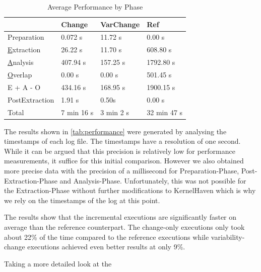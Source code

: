 \documentclass[a4paper]{article}
\begin{document}
\begin {table}[h]
\begin{center}
\caption {Average Performance by Phase} \label{tab:performance} 
\begin{tabular}{|l | l | l | l|}
\hline
                               & Change                 & VarChange          & Ref  \\ \hline
	Preparation                & 0.072 s                & 11.72 s            & 0.00 s \\
	\underline{E}xtraction     & 26.22 s                & 11.70 s            & 608.80 s \\
	\underline{A}nalysis       & 407.94 s               & 157.25 s           & 1792.80 s \\
	\underline{O}verlap        & 0.00 s                 & 0.00 s             & 501.45 s \\
	E + A - O                  & 434.16 s               & 168.95 s           & 1900.15 s \\
	PostExtraction             & 1.91 s                 & 0.50s              & 0.00 s \\ \hline
	Total                      & 7 min 16 s             & 3 min 2 s          & 32 min 47 s \\ \hline
\end{tabular}
\end{center}
\end{table}

The results shown in \autoref{tab:performance} were generated by analysing the timestamps of each log file. The timestamps have a resolution of one second. While it can be argued that this precision is relatively low for performance measurements, it suffice for this initial comparison. However we also obtained more precise data with the precision of a millisecond for Preparation-Phase, Post-Extraction-Phase and Analysis-Phase. Unfortunately, this was not possible for the Extraction-Phase without further modifications to KernelHaven which is why we rely on the timestamps of the log at this point.

The results show that the incremental executions are significantly faster on average than the reference counterpart. The change-only executions only took about 22\% of the time compared to the reference executions while variability-change executions achieved even better results at only 9\%.

Taking a more detailed look at the 


\newpage


\end{document}
